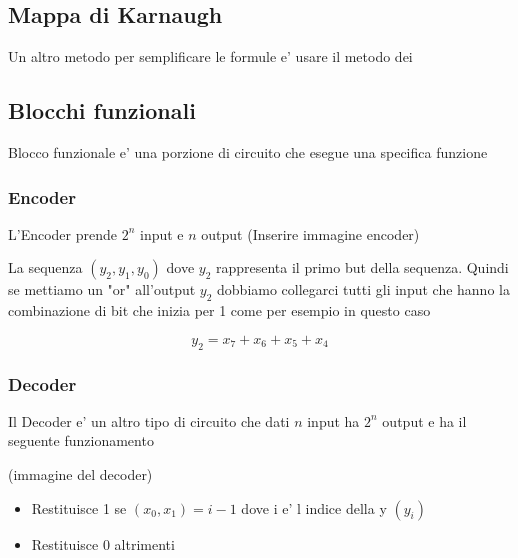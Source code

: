\documentclass{article}
\begin{document}
          \subsection{Mappa di Karnaugh}
          \begin{flushleft}
            Un altro metodo per semplificare le formule e' usare il metodo dei
          \end{flushleft}
          \subsection{Blocchi funzionali}
          \begin{flushleft}
            Blocco funzionale e' una porzione di circuito che esegue una specifica funzione
          \end{flushleft}
          \subsubsection{Encoder}
          \begin{flushleft}
            L'Encoder prende $2^n$ input e $n$ output (Inserire immagine encoder)
          \end{flushleft}
          \begin{flushleft}
            La sequenza $(y_2,y_1,y_0)$ dove $y_2$ rappresenta il primo but della sequenza.
            Quindi se mettiamo un "or" all'output $y_2$ dobbiamo collegarci tutti gli input che hanno la combinazione di bit
            che inizia per 1 come per esempio in questo caso 
          \end{flushleft}
          \begin{equation*}
            y_2=x_7+x_6+x_5+x_4
          \end{equation*}
          \subsubsection{Decoder}
          \begin{flushleft}
            Il Decoder e' un altro tipo di circuito che dati $n$ input ha $2^n$ output e ha il seguente funzionamento
          \end{flushleft}
          (immagine del decoder)
          \begin{itemize}
            \item Restituisce 1 se $(x_0,x_1)=i-1$ dove i e' l indice della y $(y_i)$
            \item Restituisce 0 altrimenti
          \end{itemize}
\end{document}
